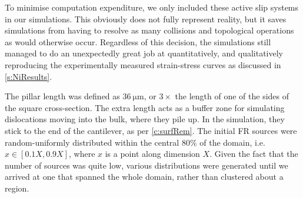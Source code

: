 To minimise computation expenditure, we only included these active slip systems in our simulations. This obviously does not fully represent reality, but it saves simulations from having to resolve as many collisions and topological operations as would otherwise occur. Regardless of this decision, the simulations still managed to do an unexpectedly great job at quantitatively, and qualitatively reproducing the experimentally measured strain-stress curves as discussed in \cref{s:NiResults}.

The pillar length was defined as $\SI{36}{\micro\metre}$, or $3\times$ the length of one of the sides of the square cross-section. The extra length acts as a buffer zone for simulating dislocations moving into the bulk, where they pile up. In the simulation, they stick to the end of the cantilever, as per \cref{c:surfRem}. The initial FR sources were random-uniformly distributed within the central $80\%$ of the domain, i.e. $x \in [0.1X, 0.9X]$, where $x$ is a point along dimension $X$. Given the fact that the number of sources was quite low, various distributions were generated until we arrived at one that spanned the whole domain, rather than clustered about a region.

